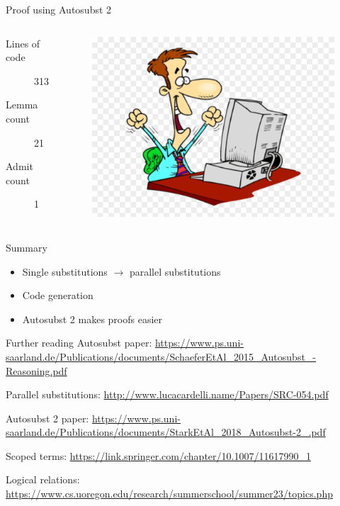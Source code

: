 \documentclass[17pt,aspectratio=169]{beamer}
\begin{document}
\begin{frame}{Proof using Autosubst 2}
    \begin{columns}
        \begin{description}
            \item[Lines of code] 313
            \item[Lemma count] 21
            \item[Admit count] 1
        \end{description}
        \begin{figure}[H]
            \centering
            \includegraphics[width=\textwidth]{./img/happy.jpg}
        \end{figure}
    \end{columns}
\end{frame}

\begin{frame}{Summary}
    \begin{itemize}
        \item Single substitutions $\rightarrow$ parallel substitutions
        \item Code generation
        \item Autosubst 2 makes proofs easier
    \end{itemize}
\end{frame}

\begin{frame}{Further reading}
    \scriptsize
    Autosubst paper: \url{https://www.ps.uni-saarland.de/Publications/documents/SchaeferEtAl_2015_Autosubst_-Reasoning.pdf}

    Parallel substitutions: \url{http://www.lucacardelli.name/Papers/SRC-054.pdf}

    Autosubst 2 paper: \url{https://www.ps.uni-saarland.de/Publications/documents/StarkEtAl_2018_Autosubst-2_.pdf}

    Scoped terms: \url{https://link.springer.com/chapter/10.1007/11617990_1}

    Logical relations: \url{https://www.cs.uoregon.edu/research/summerschool/summer23/topics.php}
\end{frame}
\end{document}
